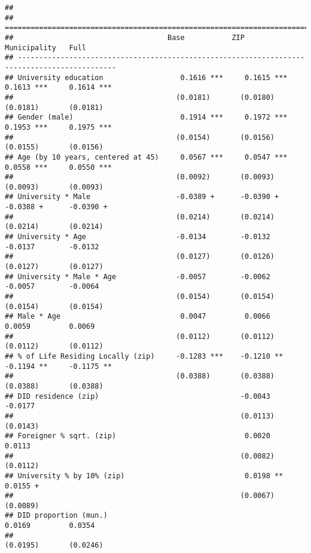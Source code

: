 \documentclass[
]{article}
\begin{document}
\begin{verbatim}
## 
## =============================================================================================
##                                    Base           ZIP            Municipality   Full         
## ---------------------------------------------------------------------------------------------
## University education                  0.1616 ***     0.1615 ***     0.1613 ***     0.1614 ***
##                                      (0.0181)       (0.0180)       (0.0181)       (0.0181)   
## Gender (male)                         0.1914 ***     0.1972 ***     0.1953 ***     0.1975 ***
##                                      (0.0154)       (0.0156)       (0.0155)       (0.0156)   
## Age (by 10 years, centered at 45)     0.0567 ***     0.0547 ***     0.0558 ***     0.0550 ***
##                                      (0.0092)       (0.0093)       (0.0093)       (0.0093)   
## University * Male                    -0.0389 +      -0.0390 +      -0.0388 +      -0.0390 +  
##                                      (0.0214)       (0.0214)       (0.0214)       (0.0214)   
## University * Age                     -0.0134        -0.0132        -0.0137        -0.0132    
##                                      (0.0127)       (0.0126)       (0.0127)       (0.0127)   
## University * Male * Age              -0.0057        -0.0062        -0.0057        -0.0064    
##                                      (0.0154)       (0.0154)       (0.0154)       (0.0154)   
## Male * Age                            0.0047         0.0066         0.0059         0.0069    
##                                      (0.0112)       (0.0112)       (0.0112)       (0.0112)   
## % of Life Residing Locally (zip)     -0.1283 ***    -0.1210 **     -0.1194 **     -0.1175 ** 
##                                      (0.0388)       (0.0388)       (0.0388)       (0.0388)   
## DID residence (zip)                                 -0.0043                       -0.0177    
##                                                     (0.0113)                      (0.0143)   
## Foreigner % sqrt. (zip)                              0.0020                        0.0113    
##                                                     (0.0082)                      (0.0112)   
## University % by 10% (zip)                            0.0198 **                     0.0155 +  
##                                                     (0.0067)                      (0.0089)   
## DID proportion (mun.)                                               0.0169         0.0354    
##                                                                    (0.0195)       (0.0246)   

\end{verbatim}
\end{document}

